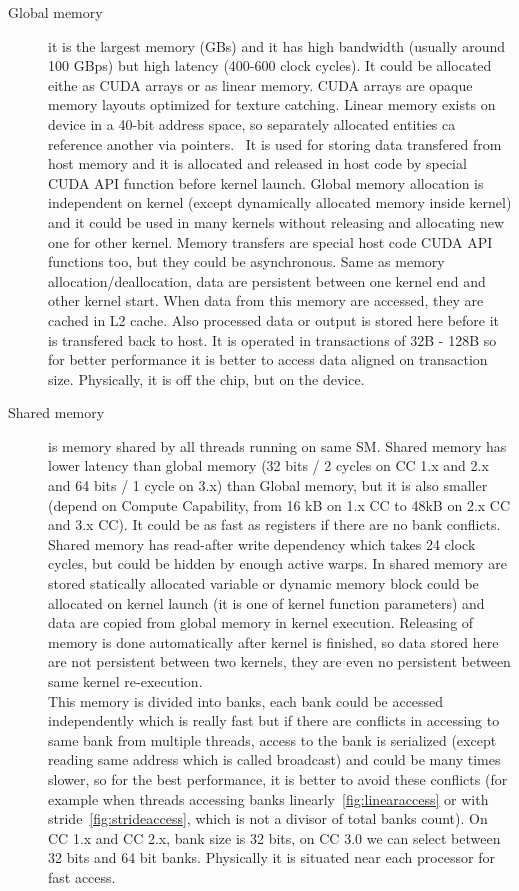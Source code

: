 \begin{description}
\item[Global memory] it is the largest memory (GBs) and it has high bandwidth (usually around 100 GBps) but high latency (400-600 clock cycles). It could be allocated eithe as CUDA arrays or as linear memory. CUDA arrays are opaque memory layouts optimized for texture catching. Linear memory exists on device in a 40-bit address space, so separately allocated entities ca reference another via pointers.~\cite{CUDAGuide} It is used for storing data transfered from host memory and it is allocated and released in host code by special CUDA API function before kernel launch. Global memory allocation is independent on kernel (except dynamically allocated memory inside kernel) and it could be used in many kernels without releasing and allocating new one for other kernel. Memory transfers are special host code CUDA API functions too, but they could be asynchronous. Same as memory allocation/deallocation, data are persistent between one kernel end and other kernel start. When data from this memory are accessed, they are cached in L2 cache. Also processed data or output is stored here before it is transfered back to host. It is operated in transactions of 32B - 128B so for better performance it is better to access data aligned on transaction size. Physically, it is off the chip, but on the device.

\item[Shared memory] is memory shared by all threads running on same SM. Shared memory has lower latency than global memory (32 bits / 2 cycles on CC 1.x and 2.x and 64 bits / 1 cycle on 3.x) than Global memory, but it is also smaller (depend on Compute Capability, from 16 kB on 1.x CC to 48kB on 2.x CC and 3.x CC). It could be as fast as registers if there are no bank conflicts. Shared memory has read-after write dependency which takes 24 clock cycles, but could be hidden by enough active warps. In shared memory are stored statically allocated variable or dynamic memory block could be allocated on kernel launch (it is one of kernel function parameters) and data are copied from global memory in kernel execution. Releasing of memory is done automatically after kernel is finished, so data stored here are not persistent between two kernels, they are even no persistent between same kernel re-execution.\\
This memory is divided into banks, each bank could be accessed independently which is really fast but if there are conflicts in accessing to same bank from multiple threads, access to the bank is serialized (except reading same address which is called broadcast) and could be many times slower, so for the best performance, it is better to avoid these conflicts (for example when threads accessing banks linearly~\ref{fig:linearaccess} or with stride~\ref{fig:strideaccess}, which is not a divisor of total banks count). On CC 1.x and CC 2.x, bank size is 32 bits, on CC 3.0 we can select between 32 bits and 64 bit banks. Physically it is situated near each processor for fast access.\\
\end{description}

